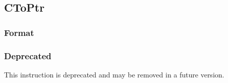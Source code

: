 \clearpage
{}
{}
\subsection*{CToPtr}

\subsubsection*{Format}


\begin{center}
\rvcheriheader
{}
\end{center}


\subsubsection*{Deprecated}

This instruction is deprecated and may be removed in a future version.
